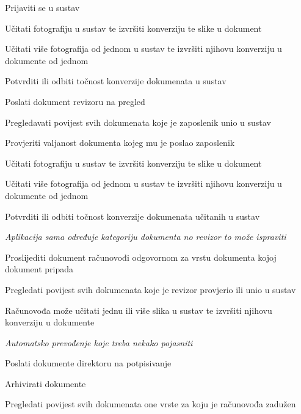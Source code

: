 			
			\begin{packed_enum}
				\item  {}
				
				\begin{packed_enum}
					
					\item Prijaviti se u sustav
					\item Učitati fotografiju u sustav te izvršiti konverziju te slike u dokument
					\item Učitati više fotografija od jednom u sustav te izvršiti njihovu konverziju u dokumente od jednom	
					\item Potvrditi ili odbiti točnost konverzije dokumenata u sustav
					\item Poslati dokument revizoru na pregled
					\item Pregledavati povijest svih dokumenata koje je zaposlenik unio u sustav
					
				\end{packed_enum}
			
				\item  {}
				
				\begin{packed_enum}

					\item Provjeriti valjanost dokumenta kojeg mu je poslao zaposlenik
					\item Učitati fotografiju u sustav te izvršiti konverziju te slike u dokument 
					\item Učitati više fotografija od jednom u sustav te izvršiti njihovu konverziju u dokumente od jednom
					\item Potvrditi ili odbiti točnost konverzije dokumenata učitanih u sustav
					\item \textit{Aplikacija sama određuje kategoriju dokumenta no revizor to može ispraviti}
					\item Proslijediti dokument računovođi odgovornom za vrstu dokumenta kojoj dokument pripada
					\item Pregledati povijest svih dokumenata koje je revizor provjerio ili unio u sustav
					
				\end{packed_enum}
			
				\item  {}
				
				\begin{packed_enum}
					\item Računovođa može učitati jednu ili više slika u sustav te izvršiti njihovu konverziju u dokumente
					\item \textit{Automatsko prevođenje koje treba nekako pojasniti}
					\item Poslati dokumente direktoru na potpisivanje
					\item Arhivirati dokumente
					\item Pregledati povijest svih dokumenata one vrste za koju je računovođa zadužen
				\end{packed_enum}
			

\end{packed_enum}
